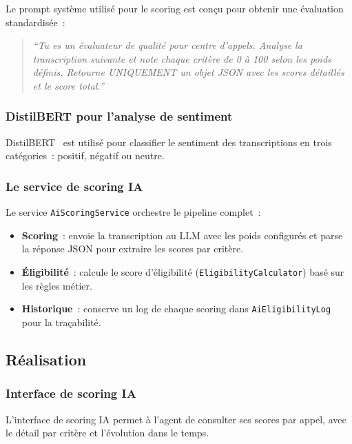 Le prompt système utilisé pour le scoring est conçu pour obtenir une évaluation standardisée~:

\begin{quote}
\small\textit{``Tu es un évaluateur de qualité pour centre d'appels. Analyse la transcription
suivante et note chaque critère de 0 à 100 selon les poids définis. Retourne UNIQUEMENT
un objet JSON avec les scores détaillés et le score total.''}
\end{quote}

\subsubsection{DistilBERT pour l'analyse de sentiment}

DistilBERT~\cite{DistilBERT} est utilisé pour classifier le sentiment des transcriptions en
trois catégories~: positif, négatif ou neutre.

\subsubsection{Le service de scoring IA}

Le service \texttt{AiScoringService} orchestre le pipeline complet~:

\begin{itemize}
    \item \textbf{Scoring}~: envoie la transcription au LLM avec les poids configurés et
    parse la réponse JSON pour extraire les scores par critère.
    \item \textbf{Éligibilité}~: calcule le score d'éligibilité (\texttt{EligibilityCalculator})
    basé sur les règles métier.
    \item \textbf{Historique}~: conserve un log de chaque scoring dans
    \texttt{AiEligibilityLog} pour la traçabilité.
\end{itemize}

\subsection{Réalisation}
\label{subsec:sprint3_realisation}

\subsubsection{Interface de scoring IA}

L'interface de scoring IA permet à l'agent de consulter ses scores par appel, avec le détail
par critère et l'évolution dans le temps.

